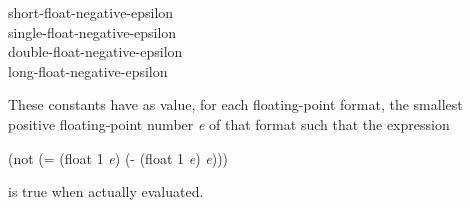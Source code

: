 \begin{defun}[Constant]
short-float-negative-epsilon \\
single-float-negative-epsilon \\
double-float-negative-epsilon \\
long-float-negative-epsilon

These constants have as value, for each floating-point format,
the smallest positive floating-point number {\it e} of that format such that
the expression
\begin{lisp}
(not (= (float 1 {\it e}) (- (float 1 {\it e}) {\it e})))
\end{lisp}
is true when actually evaluated.
\end{defun}

\endgroup
